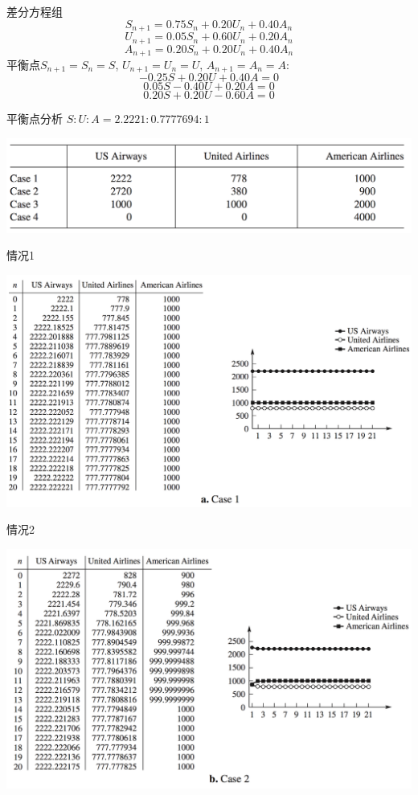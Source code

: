 \documentclass[UTF8, mathserif]{ctexbeamer}
\begin{document}
\begin{frame}{差分方程组}
\[
S_{n+1}=0.75S_n+0.20U_n+0.40A_n
\]
\[
U_{n+1}=0.05S_n+0.60U_n+0.20A_n
\]
\[
A_{n+1}=0.20S_n+0.20U_n+0.40A_n
\]
平衡点$S_{n+1}=S_n=S$, $U_{n+1}=U_n=U$, $A_{n+1}=A_n=A$:
\[
-0.25S+0.20U+0.40A=0
\]
\[
0.05S-0.40U+0.20A=0
\]
\[
0.20S+0.20U-0.60A=0
\]
\end{frame}

\begin{frame}{平衡点分析}
$S:U:A = 2.2221:0.7777694:1$

\begin{center}
  \includegraphics[width=.8\textwidth{}]{party-case.png}
\end{center}  
  
\end{frame}

\begin{frame}{情况1}
  \begin{center}
    \includegraphics[width=.9\textwidth{}]{party-1.png}
  \end{center}  
\end{frame}

\begin{frame}{情况2}
  \begin{center}
    \includegraphics[width=.9\textwidth{}]{party-2.png}
  \end{center}  
\end{frame}
\end{document}
